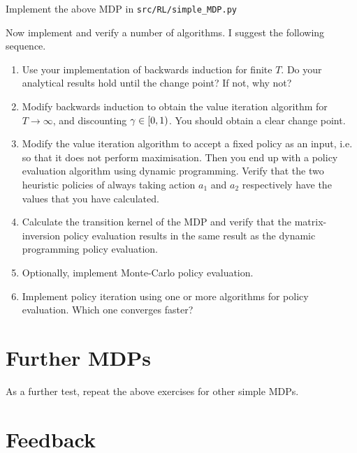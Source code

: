 \documentclass[twoside,a4paper]{article}
\begin{document}
\begin{exercise}[60-120]
  Implement the above MDP in \verb|src/RL/simple_MDP.py|
  
  Now implement and verify a number of algorithms. I suggest the following sequence.
  \begin{enumerate}
  \item Use your implementation of backwards induction for finite $T$. Do your analytical results hold until the change point? If not, why not?
  \item Modify backwards induction to obtain the value iteration algorithm for $T \to \infty$, and discounting $\gamma \in [0, 1)$. You should obtain a clear change point.
  \item Modify the value iteration algorithm to accept a fixed policy as an input, i.e. so that it does not perform maximisation. Then you end up with a policy evaluation algorithm using dynamic programming. Verify that the two heuristic policies of always taking action $a_1$ and $a_2$ respectively have the values that you have calculated.
  \item Calculate the transition kernel of the MDP and verify that the matrix-inversion policy evaluation results in the same result as the dynamic programming policy evaluation.
  \item Optionally, implement Monte-Carlo policy evaluation.
  \item Implement policy iteration using one or more algorithms for policy evaluation. Which one converges faster?
  \end{enumerate}
  \label{exercise:simple-mdp-implementation}
\end{exercise}

\section{Further MDPs}

As a further test, repeat the above exercises for other simple MDPs.

\section{Feedback}
\end{document}
